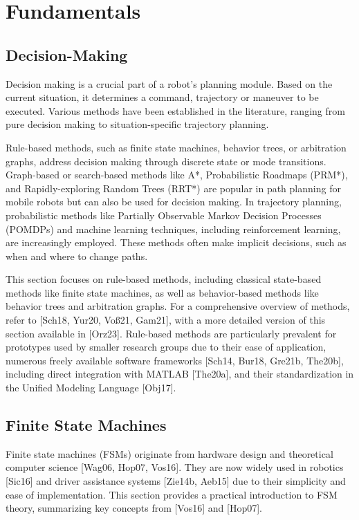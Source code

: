 
\section{Fundamentals}


\subsection{Decision-Making}

Decision making is a crucial part of a robot's planning module.
Based on the current situation, it determines a command, trajectory or maneuver to be executed.
Various methods have been established in the literature, ranging from pure decision making to situation-specific trajectory planning.

Rule-based methods, such as finite state machines, behavior trees, or arbitration graphs, address decision making through discrete state or mode transitions.
Graph-based or search-based methods like A*, Probabilistic Roadmaps (PRM*), and Rapidly-exploring Random Trees (RRT*) are popular in path planning for mobile robots but can also be used for decision making.
In trajectory planning, probabilistic methods like Partially Observable Markov Decision Processes (POMDPs) and machine learning techniques, including reinforcement learning, are increasingly employed.
These methods often make implicit decisions, such as when and where to change paths.

This section focuses on rule-based methods, including classical state-based methods like finite state machines, as well as behavior-based methods like behavior trees and arbitration graphs.
For a comprehensive overview of methods, refer to [Sch18, Yur20, Voß21, Gam21], with a more detailed version of this section available in [Orz23].
Rule-based methods are particularly prevalent for prototypes used by smaller research groups due to their ease of application, numerous freely available software frameworks [Sch14, Bur18, Gre21b, The20b], including direct integration with MATLAB [The20a], and their standardization in the Unified Modeling Language [Obj17].

\subsection{Finite State Machines}
Finite state machines (FSMs) originate from hardware design and theoretical computer science [Wag06, Hop07, Vos16].
They are now widely used in robotics [Sic16] and driver assistance systems [Zie14b, Aeb15] due to their simplicity and ease of implementation.
This section provides a practical introduction to FSM theory, summarizing key concepts from [Vos16] and [Hop07].

